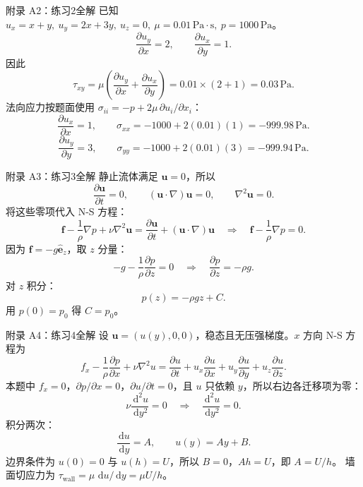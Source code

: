 \documentclass[aspectratio=169,10pt]{beamer}
\newcommand{\rd}{\,\mathrm{d}}
\newcommand{\vc}[1]{\boldsymbol{#1}}
\begin{document}
\begin{frame}{附录 A2：练习2全解}
  \footnotesize
  已知 $u_x=x+y,\ u_y=2x+3y,\ u_z=0,\ \mu=0.01\,\mathrm{Pa\cdot s},\ p=1000\,\mathrm{Pa}$。
  \[
    \frac{\partial u_y}{\partial x}=2,\qquad
    \frac{\partial u_x}{\partial y}=1.
  \]
  因此
  \[
    \tau_{xy}
    =
    \mu\left(\frac{\partial u_y}{\partial x}
    +\frac{\partial u_x}{\partial y}\right)
    =
    0.01\times(2+1)
    =
    0.03\,\mathrm{Pa}.
  \]
  法向应力按题面使用 $\sigma_{ii}=-p+2\mu\,\partial u_i/\partial x_i$：
  \[
    \frac{\partial u_x}{\partial x}=1,\qquad
    \sigma_{xx}=-1000+2(0.01)(1)=-999.98\,\mathrm{Pa}.
  \]
  \[
    \frac{\partial u_y}{\partial y}=3,\qquad
    \sigma_{yy}=-1000+2(0.01)(3)=-999.94\,\mathrm{Pa}.
  \]
\end{frame}

\begin{frame}{附录 A3：练习3全解}
  \footnotesize
  静止流体满足 $\vc u=0$，所以
  \[
    \frac{\partial\vc u}{\partial t}=0,\qquad
    (\vc u\cdot\nabla)\vc u=0,\qquad
    \nabla^2\vc u=0.
  \]
  将这些零项代入 N-S 方程：
  \[
    \vc f-\frac1\rho\nabla p+\nu\nabla^2\vc u
    =
    \frac{\partial\vc u}{\partial t}+(\vc u\cdot\nabla)\vc u
    \quad\Longrightarrow\quad
    \vc f-\frac1\rho\nabla p=0.
  \]
  因为 $\vc f=-g\hat{\vc e}_z$，取 $z$ 分量：
  \[
    -g-\frac1\rho\frac{\partial p}{\partial z}=0
    \quad\Longrightarrow\quad
    \frac{\partial p}{\partial z}=-\rho g.
  \]
  对 $z$ 积分：
  \[
    p(z)=-\rho gz+C.
  \]
  用 $p(0)=p_0$ 得 $C=p_0$。
\end{frame}

\begin{frame}{附录 A4：练习4全解}
  \footnotesize
  设 $\vc u=(u(y),0,0)$，稳态且无压强梯度。$x$ 方向 N-S 方程为
  \[
    f_x-\frac1\rho\frac{\partial p}{\partial x}
    +\nu\nabla^2u
    =
    \frac{\partial u}{\partial t}
    +u_x\frac{\partial u}{\partial x}
    +u_y\frac{\partial u}{\partial y}
    +u_z\frac{\partial u}{\partial z}.
  \]
  本题中 $f_x=0$，$\partial p/\partial x=0$，$\partial u/\partial t=0$，且 $u$ 只依赖 $y$，所以右边各迁移项为零：
  \[
    \nu\frac{\rd^2u}{\rd y^2}=0
    \quad\Longrightarrow\quad
    \frac{\rd^2u}{\rd y^2}=0.
  \]
  积分两次：
  \[
    \frac{\rd u}{\rd y}=A,\qquad
    u(y)=Ay+B.
  \]
  边界条件为 $u(0)=0$ 与 $u(h)=U$，所以 $B=0$，$Ah=U$，即 $A=U/h$。
  墙面切应力为 $\tau_{\text{wall}}=\mu\,\rd u/\rd y=\mu U/h$。
\end{frame}
\end{document}
